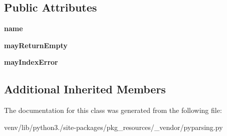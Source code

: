 \subsection*{Public Attributes}
\begin{DoxyCompactItemize}
\item 
\mbox{\label{classpkg__resources_1_1__vendor_1_1pyparsing_1_1___position_token_aedebcf41a82fdb7609c96affdfc4c94c}} 
{\bfseries name}
\item 
\mbox{\label{classpkg__resources_1_1__vendor_1_1pyparsing_1_1___position_token_a2729082829d0e4ea85fdd5597b5550d8}} 
{\bfseries may\+Return\+Empty}
\item 
\mbox{\label{classpkg__resources_1_1__vendor_1_1pyparsing_1_1___position_token_a37791b417a2b6be1ab1a9ab6c23cf32a}} 
{\bfseries may\+Index\+Error}
\end{DoxyCompactItemize}
\subsection*{Additional Inherited Members}


The documentation for this class was generated from the following file\+:\begin{DoxyCompactItemize}
\item 
venv/lib/python3./site-\/packages/pkg\+\_\+resources/\+\_\+vendor/pyparsing.\+py\end{DoxyCompactItemize}
